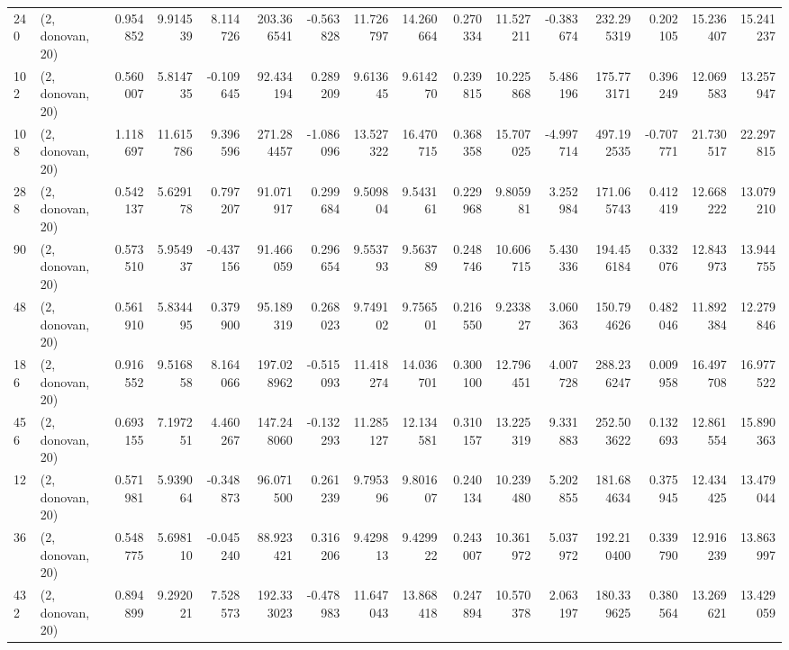 \begin{tabular}{llrrrrrrrrrrrrrr}
240 &  (2, donovan, 20) &   0.954852 &   9.914539 &   8.114726 &   203.366541 &  -0.563828 &  11.726797 &  14.260664 &  0.270334 &  11.527211 &  -0.383674 &   232.295319 &   0.202105 &  15.236407 &  15.241237 \\
102 &  (2, donovan, 20) &   0.560007 &   5.814735 &  -0.109645 &    92.434194 &   0.289209 &   9.613645 &   9.614270 &  0.239815 &  10.225868 &   5.486196 &   175.773171 &   0.396249 &  12.069583 &  13.257947 \\
108 &  (2, donovan, 20) &   1.118697 &  11.615786 &   9.396596 &   271.284457 &  -1.086096 &  13.527322 &  16.470715 &  0.368358 &  15.707025 &  -4.997714 &   497.192535 &  -0.707771 &  21.730517 &  22.297815 \\
288 &  (2, donovan, 20) &   0.542137 &   5.629178 &   0.797207 &    91.071917 &   0.299684 &   9.509804 &   9.543161 &  0.229968 &   9.805981 &   3.252984 &   171.065743 &   0.412419 &  12.668222 &  13.079210 \\
90  &  (2, donovan, 20) &   0.573510 &   5.954937 &  -0.437156 &    91.466059 &   0.296654 &   9.553793 &   9.563789 &  0.248746 &  10.606715 &   5.430336 &   194.456184 &   0.332076 &  12.843973 &  13.944755 \\
48  &  (2, donovan, 20) &   0.561910 &   5.834495 &   0.379900 &    95.189319 &   0.268023 &   9.749102 &   9.756501 &  0.216550 &   9.233827 &   3.060363 &   150.794626 &   0.482046 &  11.892384 &  12.279846 \\
186 &  (2, donovan, 20) &   0.916552 &   9.516858 &   8.164066 &   197.028962 &  -0.515093 &  11.418274 &  14.036701 &  0.300100 &  12.796451 &   4.007728 &   288.236247 &   0.009958 &  16.497708 &  16.977522 \\
456 &  (2, donovan, 20) &   0.693155 &   7.197251 &   4.460267 &   147.248060 &  -0.132293 &  11.285127 &  12.134581 &  0.310157 &  13.225319 &   9.331883 &   252.503622 &   0.132693 &  12.861554 &  15.890363 \\
12  &  (2, donovan, 20) &   0.571981 &   5.939064 &  -0.348873 &    96.071500 &   0.261239 &   9.795396 &   9.801607 &  0.240134 &  10.239480 &   5.202855 &   181.684634 &   0.375945 &  12.434425 &  13.479044 \\
36  &  (2, donovan, 20) &   0.548775 &   5.698110 &  -0.045240 &    88.923421 &   0.316206 &   9.429813 &   9.429922 &  0.243007 &  10.361972 &   5.037972 &   192.210400 &   0.339790 &  12.916239 &  13.863997 \\
432 &  (2, donovan, 20) &   0.894899 &   9.292021 &   7.528573 &   192.333023 &  -0.478983 &  11.647043 &  13.868418 &  0.247894 &  10.570378 &   2.063197 &   180.339625 &   0.380564 &  13.269621 &  13.429059 \\

\end{tabular}
